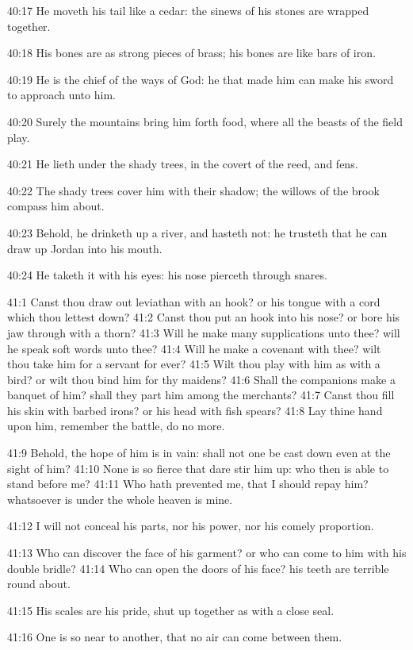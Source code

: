40:17 He moveth his tail like a cedar: the sinews of his stones are
wrapped together.

40:18 His bones are as strong pieces of brass; his bones are like bars
of iron.

40:19 He is the chief of the ways of God: he that made him can make
his sword to approach unto him.

40:20 Surely the mountains bring him forth food, where all the beasts
of the field play.

40:21 He lieth under the shady trees, in the covert of the reed, and
fens.

40:22 The shady trees cover him with their shadow; the willows of the
brook compass him about.

40:23 Behold, he drinketh up a river, and hasteth not: he trusteth
that he can draw up Jordan into his mouth.

40:24 He taketh it with his eyes: his nose pierceth through snares.

41:1 Canst thou draw out leviathan with an hook? or his tongue with a
cord which thou lettest down?  41:2 Canst thou put an hook into his
nose? or bore his jaw through with a thorn?  41:3 Will he make many
supplications unto thee? will he speak soft words unto thee?  41:4
Will he make a covenant with thee? wilt thou take him for a servant
for ever?  41:5 Wilt thou play with him as with a bird? or wilt thou
bind him for thy maidens?  41:6 Shall the companions make a banquet of
him? shall they part him among the merchants?  41:7 Canst thou fill
his skin with barbed irons? or his head with fish spears?  41:8 Lay
thine hand upon him, remember the battle, do no more.

41:9 Behold, the hope of him is in vain: shall not one be cast down
even at the sight of him?  41:10 None is so fierce that dare stir him
up: who then is able to stand before me?  41:11 Who hath prevented me,
that I should repay him? whatsoever is under the whole heaven is mine.

41:12 I will not conceal his parts, nor his power, nor his comely
proportion.

41:13 Who can discover the face of his garment? or who can come to him
with his double bridle?  41:14 Who can open the doors of his face? his
teeth are terrible round about.

41:15 His scales are his pride, shut up together as with a close seal.

41:16 One is so near to another, that no air can come between them.

